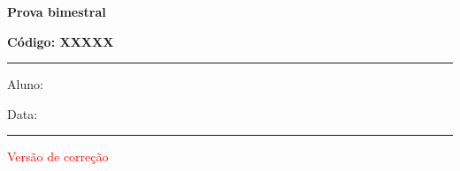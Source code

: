 \documentclass[12pt, addpoints]{exam}
\begin{document}
        
\begin{minipage}[l]{0.5\linewidth}
    \begin{flushleft}
        {\bf \Large Prova bimestral}
    \end{flushleft}
\end{minipage}
\begin{minipage}[r]{0.45\linewidth}
    \begin{flushright}
        {\bf \Large Código: XXXXX}
    \end{flushright}
\end{minipage}
\vspace{0.5cm} \hrule \vspace{0.5cm}
\begin{minipage}{0.75\linewidth}
    Aluno:
\end{minipage}
\begin{minipage}{0.20\linewidth}
    Data: 
\end{minipage}
\vspace{0.5cm} \hrule \vspace{0.5cm}
\begin{center}
    \textcolor{red}{\large Versão de correção}
\end{center}
\end{document}
